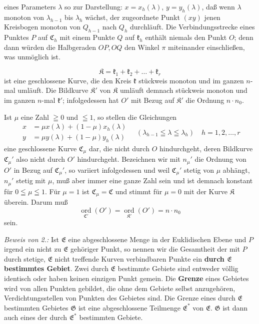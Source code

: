 \documentclass{article}
\begin{document}
eines Parameters $\lambda$ so zur Darstellung: $x = x_h(\lambda)$, $y = y_h(\lambda)$, daß wenn $\lambda$ monoton von $\lambda_{h-1}$ bis $\lambda_h$ wächst, der zugeordnete Punkt $(xy)$ jenen Kreisbogen monoton von $Q_{h-1}$ nach $Q_h$ durchläuft. Die Verbindungsstrecke eines Punktes $P$ auf $\mathfrak{C}_h$ mit einem Punkte $Q$ auf $\mathfrak{k}_h$ enthält niemals den Punkt $O$; denn dann würden die Halbgeraden $OP, OQ$ den Winkel $\pi$ miteinander einschließen, was unmöglich ist.


\[ \mathfrak{K} = \mathfrak{k}_1 + \mathfrak{k}_2 + \dots + \mathfrak{k}_r \]
ist eine geschlossene Kurve, die den Kreis $\mathfrak{k}$ stückweis monoton und im ganzen $n$-mal umläuft. Die Bildkurve $\mathfrak{K}'$ von $\mathfrak{K}$ umläuft demnach stückweis monoton und im ganzen $n$-mal $\mathfrak{k}'$; infolgedessen hat $O'$ mit Bezug auf $\mathfrak{K}'$ die Ordnung $n \cdot n_0$.

Ist $\mu$ eine Zahl $\geqq 0$ und $\leqq 1$, so stellen die Gleichungen
\[ \begin{aligned} x &= \mu x(\lambda) + (1 - \mu) x_h(\lambda) \\ y &= \mu y(\lambda) + (1 - \mu) y_h(\lambda) \end{aligned} \quad (\lambda_{h-1} \leqq \lambda \leqq \lambda_h) \quad h = 1, 2, \dots, r \]
eine geschlossene Kurve $\mathfrak{C}_\mu$ dar, die nicht durch $O$ hindurchgeht, deren Bildkurve $\mathfrak{C}_\mu'$ also nicht durch $O'$ hindurchgeht. Bezeichnen wir mit $n_\mu'$ die Ordnung von $O'$ in Bezug auf $\mathfrak{C}_\mu'$, so variiert infolgedessen und weil $\mathfrak{C}_\mu'$ stetig von $\mu$ abhängt, $n_\mu'$ stetig mit $\mu$, muß aber immer eine ganze Zahl sein und ist demnach konstant für $0 \leqq \mu \leqq 1$. Für $\mu = 1$ ist $\mathfrak{C}_\mu = \mathfrak{C}$ und stimmt für $\mu = 0$ mit der Kurve $\mathfrak{K}$ überein. Darum muß
\[ \underset{\mathfrak{C}'}{\operatorname{ord}}(O') = \underset{\mathfrak{K}'}{\operatorname{ord}}(O') = n \cdot n_0 \]
sein.

\emph{Beweis von 2.:} Ist $\mathfrak{E}$ eine abgeschlossene Menge in der Euklidischen Ebene und $P$ irgend ein nicht zu $\mathfrak{E}$ gehöriger Punkt, so nennen wir die Gesamtheit der mit $P$ durch stetige, $\mathfrak{E}$ nicht treffende Kurven verbindbaren Punkte ein \textbf{durch $\mathfrak{E}$ bestimmtes Gebiet}. Zwei durch $\mathfrak{E}$ bestimmte Gebiete sind entweder völlig identisch oder haben keinen einzigen Punkt gemein. Die \textbf{Grenze} eines Gebietes wird von allen Punkten gebildet, die ohne dem Gebiete selbst anzugehören, Verdichtungsstellen von Punkten des Gebietes sind. Die Grenze eines durch $\mathfrak{E}$ bestimmten Gebietes $\mathfrak{G}$ ist eine abgeschlossene Teilmenge $\mathfrak{E}^*$ von $\mathfrak{E}$. $\mathfrak{G}$ ist dann auch eines der durch $\mathfrak{E}^*$ bestimmten Gebiete.
\end{document}
